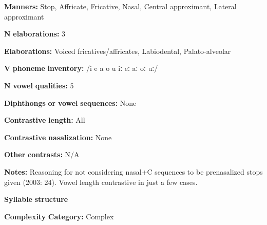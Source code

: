 \begin{styleBody}
\textbf{Manners:} Stop, Affricate, Fricative, Nasal, Central approximant, Lateral approximant
\end{styleBody}

\begin{styleBody}
\textbf{N} \textbf{elaborations:} 3
\end{styleBody}

\begin{styleBody}
\textbf{Elaborations:} Voiced fricatives/affricates, Labiodental, Palato-alveolar
\end{styleBody}

\begin{styleBody}
\textbf{V} \textbf{phoneme} \textbf{inventory:} /i e a o u iː eː aː oː uː/
\end{styleBody}

\begin{styleBody}
\textbf{N} \textbf{vowel} \textbf{qualities:} 5
\end{styleBody}

\begin{styleBody}
\textbf{Diphthongs} \textbf{or} \textbf{vowel} \textbf{sequences:} None
\end{styleBody}

\begin{styleBody}
\textbf{Contrastive} \textbf{length:} All
\end{styleBody}

\begin{styleBody}
\textbf{Contrastive} \textbf{nasalization:} None
\end{styleBody}

\begin{styleBody}
\textbf{Other} \textbf{contrasts:} N/A
\end{styleBody}

\begin{styleBody}
\textbf{Notes:} Reasoning for not considering nasal+C sequences to be prenasalized stops given (2003: 24). Vowel length contrastive in just a few cases.
\end{styleBody}

\begin{styleBody}
\textbf{Syllable} \textbf{structure}
\end{styleBody}

\begin{styleBody}
\textbf{Complexity} \textbf{Category:} Complex
\end{styleBody}

